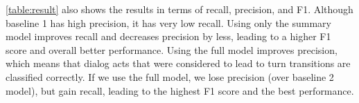 \ref{table:result} also shows the results in terms of recall, precision, and F1.  Although baseline 1 has high precision, it has very low recall. Using only the summary model improves recall and decreases precision by less, leading to a higher F1 score and overall better performance. Using the full model improves precision, which means that dialog acts that were considered to lead to turn transitions are classified correctly. If we use the full model, we lose precision (over baseline 2 model), but gain recall,
leading to the highest F1 score and the best performance.


